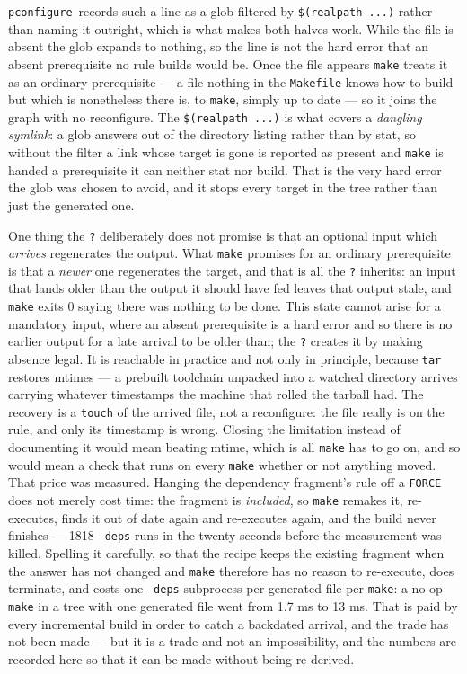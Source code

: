 \documentclass{article}
\newcommand{\pconfigure}{\texttt{pconfigure}}
\begin{document}
\pconfigure\ records such a line as a glob filtered by
\texttt{\$(realpath ...)} rather than naming it outright, which is what
makes both halves work.  While the file is absent the glob expands to
nothing, so the line is not the hard error that an absent prerequisite
no rule builds would be.  Once the file appears \texttt{make} treats it
as an ordinary prerequisite --- a file nothing in the \texttt{Makefile}
knows how to build but which is nonetheless there is, to \texttt{make},
simply up to date --- so it joins the graph with no reconfigure.  The
\texttt{\$(realpath ...)} is what covers a \emph{dangling symlink}:
a glob answers out of the directory listing rather than by stat, so
without the filter a link whose target is gone is reported as present
and \texttt{make} is handed a prerequisite it can neither stat nor
build.  That is the very hard error the glob was chosen to avoid, and
it stops every target in the tree rather than just the generated one.

One thing the \texttt{?} deliberately does not promise is that an
optional input which \emph{arrives} regenerates the output.  What
\texttt{make} promises for an ordinary prerequisite is that a
\emph{newer} one regenerates the target, and that is all the
\texttt{?} inherits: an input that lands older than the output it should
have fed leaves that output stale, and \texttt{make} exits 0 saying
there was nothing to be done.  This state cannot arise for a mandatory
input, where an absent prerequisite is a hard error and so there is no
earlier output for a late arrival to be older than; the \texttt{?}
creates it by making absence legal.  It is reachable in practice and not
only in principle, because \texttt{tar} restores mtimes --- a prebuilt
toolchain unpacked into a watched directory arrives carrying whatever
timestamps the machine that rolled the tarball had.  The recovery is a
\texttt{touch} of the arrived file, not a reconfigure: the file really is
on the rule, and only its timestamp is wrong.  Closing the limitation
instead of documenting it would mean beating mtime, which is all
\texttt{make} has to go on, and so would mean a check that runs on every
\texttt{make} whether or not anything moved.  That price was measured.
Hanging the dependency fragment's rule off a \texttt{FORCE} does not
merely cost time: the fragment is \emph{included}, so \texttt{make}
remakes it, re-executes, finds it out of date again and re-executes
again, and the build never finishes --- 1818 \texttt{--deps} runs in the
twenty seconds before the measurement was killed.  Spelling it
carefully, so that the recipe keeps the existing fragment when the
answer has not changed and \texttt{make} therefore has no reason to
re-execute, does terminate, and costs one \texttt{--deps} subprocess per
generated file per \texttt{make}: a no-op \texttt{make} in a tree with
one generated file went from 1.7 ms to 13 ms.  That is paid by every
incremental build in order to catch a backdated arrival, and the trade
has not been made --- but it is a trade and not an impossibility, and
the numbers are recorded here so that it can be made without being
re-derived.
\end{document}

